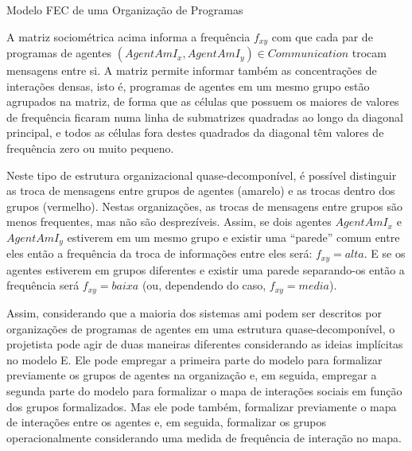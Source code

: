\begin{section}{Modelo FEC de uma Organização de Programas}
    \begin{figure}[h!]
        \centering
    \end{figure}
    
    A matriz sociométrica acima informa a frequência $f_{xy}$ com que cada par de programas de agentes $(AgentAmI_x, AgentAmI_y) \in Communication$ trocam mensagens entre si. A matriz permite informar também as concentrações de interações densas, isto é, programas de agentes em um mesmo grupo estão agrupados na matriz, de forma que as células que possuem os maiores de valores de frequência ficaram numa linha de submatrizes quadradas ao longo da diagonal principal, e todos as células fora destes quadrados da diagonal têm valores de frequência zero ou muito pequeno.    
    
    Neste tipo de estrutura organizacional quase-decomponível, é possível distinguir as troca de mensagens entre grupos de agentes (amarelo) e as trocas dentro dos grupos (vermelho). Nestas organizações, as trocas de mensagens entre grupos são menos frequentes, mas não são desprezíveis. Assim, se dois agentes $AgentAmI_x$ e $AgentAmI_y$ estiverem em um mesmo grupo e existir uma “parede” comum entre eles então a frequência da troca de informações entre eles será: $f_{xy} = alta$. E se os agentes estiverem em grupos diferentes e existir uma parede separando-os então a frequência será $f_{xy} = baixa$ (ou, dependendo do caso, $f_{xy} = media$).
    
    Assim, considerando que a maioria dos sistemas \acrshort{ami} podem ser descritos por organizações de programas de agentes em uma estrutura quase-decomponível, o projetista pode agir de duas maneiras diferentes considerando as ideias implícitas no modelo E. Ele pode empregar a primeira parte do modelo para formalizar previamente os grupos de agentes na organização e, em seguida, empregar a segunda parte do modelo para formalizar o mapa de interações sociais em função dos grupos formalizados. Mas ele pode também, formalizar previamente o mapa de interações entre os agentes e, em seguida, formalizar os grupos operacionalmente considerando uma medida de frequência de interação no mapa. 
    

\end{section}
